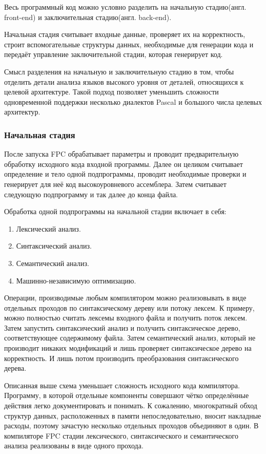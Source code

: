 \documentclass{imcs}
\begin{document}
Весь программный код можно условно разделить на начальную стадию(англ. front-end)
и заключительная стадию(англ. back-end)\cite{dragonbook}.

Начальная стадия считывает входные данные, проверяет их на корректность, строит
вспомогательные структуры данных, необходимые для генерации кода и передаёт 
управление заключительной стадии, которая генерирует код.

Смысл разделения на начальную и заключительную стадию в
том, чтобы отделить детали анализа языков высокого уровня от деталей,
относящихся к целевой архитектуре. Такой подход позволяет уменьшить сложности
одновременной поддержки несколько диалектов Pascal и большого числа целевых
архитектур.

\subsubsection{Начальная стадия}

После запуска FPC обрабатывает параметры и проводит предварительную обработку
исходного кода входной программы. Далее он целиком считывает определение и тело
одной подпрограммы, проводит необходимые проверки и генерирует для неё
код высокоуровневого ассемблера. Затем считывает следующую подпрограмму и так далее
до конца файла.

Обработка одной подпрограммы на начальной стадии включает в себя:
\begin{enumerate}
    \item Лексический анализ.
    \item Синтаксический анализ.
    \item Семантический анализ.
    \item Машинно-независимую оптимизацию.
\end{enumerate}

Операции, производимые любым компилятором можно реализовывать в виде
отдельных проходов по синтаксическому дереву или потоку лексем. К примеру, можно
полностью считать лексемы входного файла и получить поток лексем. Затем запустить
синтаксический анализ и получить синтаксическое дерево, соответствующее содержимому
файла. Затем семантический анализ, который не производит никаких модификаций и 
лишь проверяет синтаксическое дерево на корректность. И лишь потом производить
преобразования синтаксического дерева.

Описанная выше схема уменьшает сложность исходного кода компилятора. Программу, в которой отдельные 
компоненты совершают чётко определённые действия легко документировать и понимать.
К сожалению, многократный обход структур данных, расположенных в памяти непоследовательно,
вносит накладные расходы\cite{kaspersky}, поэтому
зачастую несколько отдельных проходов объединяют в один. В компиляторе FPC стадии
лексического, синтаксического и семантического анализа реализованы в виде одного
прохода. 
\end{document}
